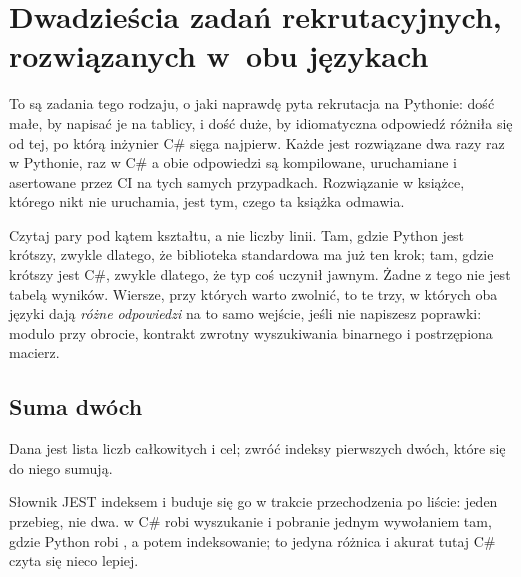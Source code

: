 
\chapter{Dwadzieścia zadań rekrutacyjnych, rozwiązanych w~obu językach}
\label{app:interview}

\noindent
To są zadania tego rodzaju, o jaki naprawdę pyta rekrutacja na Pythonie:
dość małe, by napisać je na tablicy, i dość duże, by idiomatyczna
odpowiedź różniła się od tej, po którą inżynier C\# sięga najpierw. Każde
jest rozwiązane dwa razy \dash{} raz w Pythonie, raz w C\# \dash{} a obie
odpowiedzi są kompilowane, uruchamiane i asertowane przez CI na tych samych
przypadkach. Rozwiązanie w książce, którego nikt nie uruchamia, jest tym,
czego ta książka odmawia.

Czytaj pary pod kątem kształtu, a nie liczby linii. Tam, gdzie Python jest
krótszy, zwykle dlatego, że biblioteka standardowa ma już ten krok; tam,
gdzie krótszy jest C\#, zwykle dlatego, że typ coś uczynił jawnym. Żadne z
tego nie jest tabelą wyników. Wiersze, przy których warto zwolnić, to te
trzy, w których oba języki dają \emph{różne odpowiedzi} na to samo wejście,
jeśli nie napiszesz poprawki: modulo przy obrocie, kontrakt zwrotny
wyszukiwania binarnego i postrzępiona macierz.

\section{Suma dwóch}
\label{sec:appD-two-sum}

\noindent
Dana jest lista liczb całkowitych i cel; zwróć indeksy pierwszych dwóch, które się do niego sumują.



\noindent
Słownik JEST indeksem i buduje się go w trakcie przechodzenia po liście: jeden przebieg, nie dwa.  w C\# robi wyszukanie i pobranie jednym wywołaniem tam, gdzie Python robi , a potem indeksowanie; to jedyna różnica i akurat tutaj C\# czyta się nieco lepiej.

